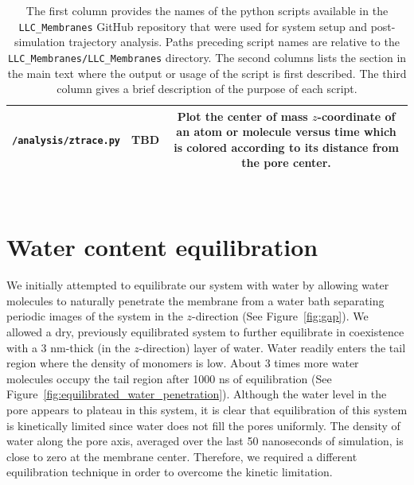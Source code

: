 \documentclass{article}
\begin{document}
\begin{table}[htb!]
\begin{tabular}{|A|B|C|}
  \texttt{/analysis/ztrace.py} & TBD & Plot the center of mass $z$-coordinate of an atom or molecule
  versus time which is colored according to its distance from the pore center. \\ \hline

  \end{tabular}

  \caption{The first column provides the names of the python scripts available in
  the \texttt{LLC\_Membranes} GitHub repository that were used for system setup and 
  post-simulation trajectory analysis. Paths preceding script names are relative to the
  \texttt{LLC\_Membranes/LLC\_Membranes} directory. The second columns lists the section in the main
  text where the output or usage of the script is first described. The third column
  gives a brief description of the purpose of each script.
  }~\label{table:python_scripts}

  \end{table}

  \section{Water content equilibration}\label{section:water_content_equil}

  We initially attempted to equilibrate our system with water by allowing water
  molecules to naturally penetrate the membrane from a water bath separating
  periodic images of the system in the $z$-direction (See Figure~\ref{fig:gap}).
  We allowed a dry, previously equilibrated system to further equilibrate in
  coexistence with a 3 nm-thick (in the $z$-direction) layer of water. Water
  readily enters the tail region where the density of monomers is low. About 3
  times more water molecules occupy the tail region after 1000 ns of
  equilibration (See Figure~\ref{fig:equilibrated_water_penetration}). Although
  the water level in the pore appears to plateau in this system, it is clear that
  equilibration of this system is kinetically limited since water does not fill
  the pores uniformly. The density of water along the pore axis, averaged over
  the last 50 nanoseconds of simulation, is close to zero at the membrane center.
  Therefore, we required a different equilibration technique in order to overcome
  the kinetic limitation.
\end{document}
